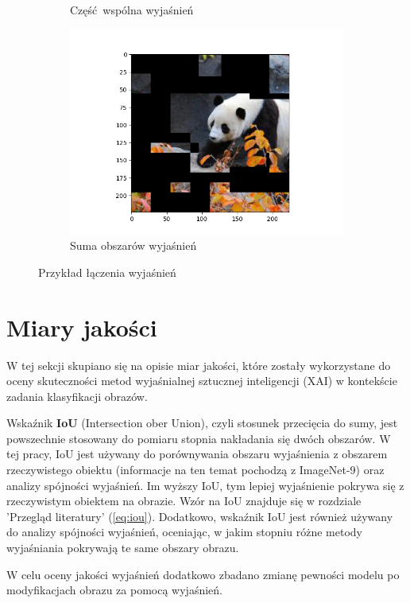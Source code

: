 \begin{figure}[!h]
\begin{subfigure}[b]{0.45\textwidth}
		\caption{Część wspólna wyjaśnień}  \label{rys:example_combine_and}
	\end{subfigure}
	\begin{subfigure}[b]{0.45\textwidth}
		\centering\includegraphics[width=.9\textwidth]{img/examples/or_explanation}
		\caption{Suma obszarów wyjaśnień}  \label{rys:example_combine_or}
	\end{subfigure}
	\caption{Przykład łączenia wyjaśnień}
\end{figure}

\section*{Miary jakości}

W tej sekcji skupiano się na opisie miar jakości, które zostały wykorzystane do oceny skuteczności metod wyjaśnialnej sztucznej inteligencji (XAI) w kontekście zadania klasyfikacji obrazów.

Wskaźnik \textbf{IoU} (Intersection ober Union), czyli stosunek przecięcia do sumy, jest powszechnie stosowany do pomiaru stopnia nakładania się dwóch obszarów.
W tej pracy, IoU jest używany do porównywania obszaru wyjaśnienia z obszarem rzeczywistego obiektu (informacje na ten temat pochodzą z ImageNet-9) oraz analizy spójności wyjaśnień.
Im wyższy IoU, tym lepiej wyjaśnienie pokrywa się z rzeczywistym obiektem na obrazie.
Wzór na IoU znajduje się w rozdziale 'Przegląd literatury' (\ref{eq:iou}).
Dodatkowo, wskaźnik IoU jest również używany do analizy spójności wyjaśnień, oceniając, w jakim stopniu różne metody wyjaśniania pokrywają te same obszary obrazu.

W celu oceny jakości wyjaśnień dodatkowo zbadano zmianę pewności modelu po modyfikacjach obrazu za pomocą wyjaśnień.

